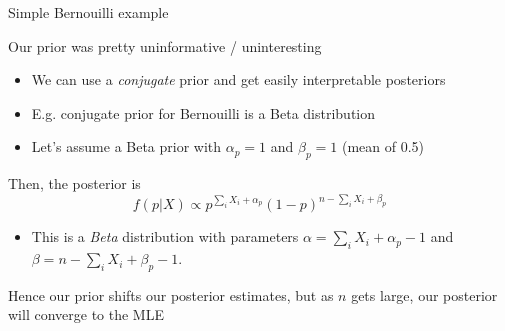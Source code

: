 \documentclass[notes,11pt, aspectratio=169]{beamer}
\newenvironment{wideitemize}{\itemize\addtolength{\itemsep}{10pt}}{\enditemize}
\begin{document}
\begin{frame}{Simple Bernouilli example}
  \begin{wideitemize}
  \item Our prior was pretty uninformative / uninteresting
    \begin{itemize}
    \item We can use a \emph{conjugate} prior and get easily interpretable posteriors
    \item E.g. conjugate prior for Bernouilli is a Beta distribution
    \item Let's assume a Beta prior with $\alpha_{p} = 1$ and $\beta_{p} = 1$ (mean of 0.5)
    \end{itemize}
  \item Then, the posterior is
    $$ f(p | X) \propto p^{\sum_{i}X_{i} + \alpha_{p}}(1-p)^{n - \sum_{i}X_{i} + \beta_{p}}$$
    \begin{itemize}
    \item This is a \emph{Beta} distribution with
      parameters $\alpha = \sum_{i}X_{i} + \alpha_{p} - 1$ and
      $\beta = n - \sum_{i}X_{i} + \beta_{p} - 1$.
    \end{itemize}
  \item Hence our prior shifts our posterior estimates, but as $n$
    gets large, our posterior will converge to the MLE
  \end{wideitemize}
\end{frame}
\end{document}
